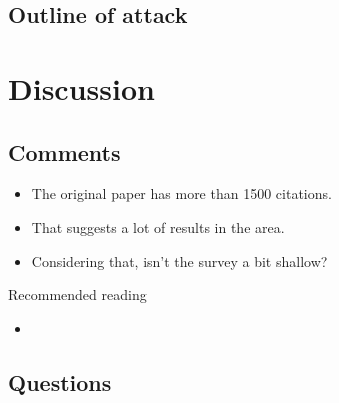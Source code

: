 \subsection{Outline of attack}

\begin{frame}
\end{frame}


\section{Discussion}

\subsection{Comments}

\begin{frame}
  \begin{question}
    \begin{itemize}
      \item The original paper has more than 1500 citations.
      \item That suggests a lot of results in the area.

        \pause{}

      \item Considering that, isn't the survey a bit shallow?
    \end{itemize}
  \end{question}
\end{frame}

\begin{frame}
  \begin{block}{Recommended reading}
    \begin{itemize}
      \item {}
    \end{itemize}
  \end{block}
\end{frame}

\subsection{Questions}

